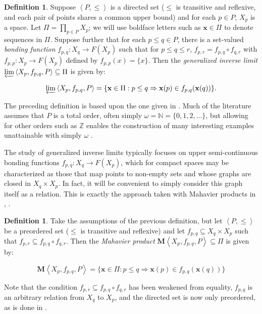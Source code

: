 \documentclass{article}
\newcommand{\term}{\textit}
\newcommand{\vect}{\mathbf}
\newcommand{\tuple}[1]{\left\langle{#1}\right\rangle}
\newcommand{\genInvLim}[1]{\varprojlim\tuple{#1}}
\newcommand{\maProd}[1]{{\mathbf{M}}\tuple{#1}}
\theoremstyle{plain}
\theoremstyle{definition}
\newtheorem{definition}[theorem]{Definition}
\theoremstyle{remark}
\begin{document}
\begin{definition}
Suppose \(\tuple{P,\leq}\) is a directed set (\(\leq\) is transitive and reflexive, and each pair of points shares a common upper bound)
and for each \(p \in P\), \(X_p\) is a space. 
Let \(\Pi=\prod_{p\in P}X_p\); we will use boldface letters such as 
\(\vect{x}\in\Pi\) to denote sequences in \(\Pi\).
Suppose further that for each \(p \leq q \in P\), there is a set-valued 
\term{bonding function}
\(f_{p,q} : X_q \to F(X_p)\) 
such that for \(p\leq q\leq r\),
\(
  f_{p,r}=f_{p,q}\circ f_{q,r}
\) 
with \(f_{p,p}:X_p\to F(X_p)\) 
defined by \(f_{p,p}(x)=\{x\}\).
Then the \term{generalized inverse limit} 
\(\genInvLim{X_p, f_{p,q}, P}\subseteq\Pi\) is given by:

\[
  \genInvLim{X_p, f_{p,q}, P} 
= 
  \{
    \textbf{x}\in \Pi 
  : 
    p \leq q \Rightarrow \vect{x}(p) \in f_{p,q}(\vect{x}(q)) 
  \}
.\]
\end{definition}

The preceding definition is based upon the one given in \cite{IngMahbook}.
Much of the literature assumes that \(P\) is a total order,
often simply \(\omega=\mathbb{N}=\{0,1,2,\dots\}\), but
allowing for other orders such as \(\mathbb{Z}\) enables
the construction of many interesting examples unattainable with
simply \(\omega\) \cite{vernon}.

The study of generalized inverse limits typically focuses on
upper semi-continuous bonding functions \(f_{p,q}:X_q\to F(X_p)\), 
which for compact
spaces may be characterized as those that map points to non-empty sets
and whose graphs are closed in \(X_q\times X_p\). 
In fact, it will be convenient to simply consider
this graph itself as a relation. This is
exactly the approach taken with Mahavier products
in \cite{charroe}, \cite{GreenKen}.

\begin{definition}
Take the assumptions of the previous definition,
but let \(\tuple{P,\leq}\) be a preordered set (\(\leq\) is transitive and reflexive) and let \(f_{p,q}\subseteq X_q\times X_p\)
such that \(f_{p,r}\subseteq f_{p,q}\circ f_{q,r}\).
Then the \term{Mahavier product} 
\(\maProd{X_p, f_{p,q}, P}\subseteq\Pi\) is given by:

\[
  \maProd{X_p, f_{p,q}, P} 
= 
  \{
    \textbf{x}\in \Pi 
  : 
    p \leq q \Rightarrow \vect{x}(p) \in f_{p,q}(\vect{x}(q)) 
  \}
\]
\end{definition}

Note that the condition 
\(f_{p,r}\subseteq f_{p,q} \circ f_{q,r}\)
has been weakened from equality,
\(f_{p,q}\) is an arbitrary relation from
\(X_q\) to \(X_p\),
and the directed set is now only preordered,
as is done in \cite{charroe}.
\end{document}
